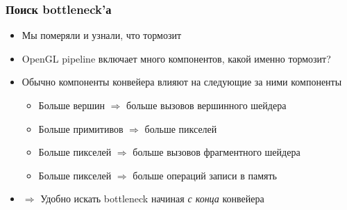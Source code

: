 \documentclass{beamer}
\begin{document}
\begin{frame}[fragile]
\frametitle{Поиск bottleneck'а}
\begin{itemize}
\item Мы померяли и узнали, что тормозит
\pause
\item OpenGL pipeline включает много компонентов, какой именно тормозит?
\pause
\item Обычно компоненты конвейера влияют на следующие за ними компоненты
\pause
\begin{itemize}
\item Больше вершин \begin{math}\Rightarrow\end{math} больше вызовов вершинного шейдера
\item Больше примитивов \begin{math}\Rightarrow\end{math} больше пикселей
\item Больше пикселей \begin{math}\Rightarrow\end{math} больше вызовов фрагментного шейдера
\item Больше пикселей \begin{math}\Rightarrow\end{math} больше операций записи в память
\end{itemize}
\pause
\item \begin{math}\Rightarrow\end{math} Удобно искать bottleneck начиная \textit{с конца} конвейера
\end{itemize}
\end{frame}
\end{document}
